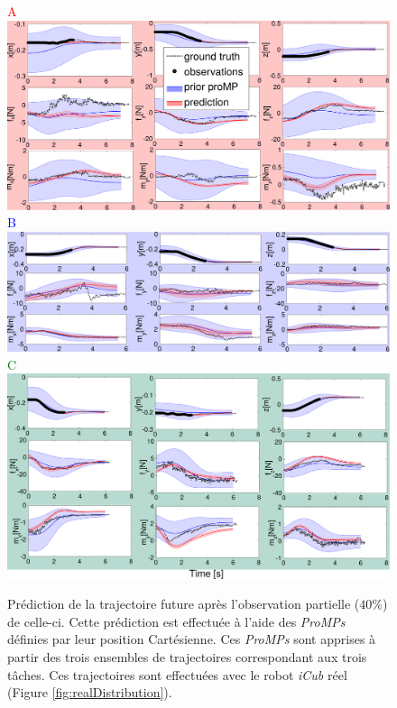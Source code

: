 \documentclass[utf8]{frontiersSCNS} %
\begin{document}
\begin{figure}[!h]
\centering
{
\textcolor{red}{A}\\
\includegraphics[width=15cm]{img/infA.pdf}\\
\textcolor{blue}{B}\\
\includegraphics[width=15cm]{img/infb.pdf}\\
\textcolor{green}{C}\\
\includegraphics[width=15cm]{img/infc.pdf}\\
}
\caption{Prédiction de la trajectoire future après l'observation partielle ($40\%$) de celle-ci. Cette prédiction est effectuée à l'aide des \textit{ProMPs} définies par leur position Cartésienne. Ces \textit{ProMPs} sont apprises à partir des trois ensembles de trajectoires correspondant aux trois tâches. Ces trajectoires sont effectuées avec le robot \textit{iCub} réel (Figure \ref{fig:realDistribution}).}
\label{fig:realTrajectoriesPredictions}
\end{figure}
\end{document}
